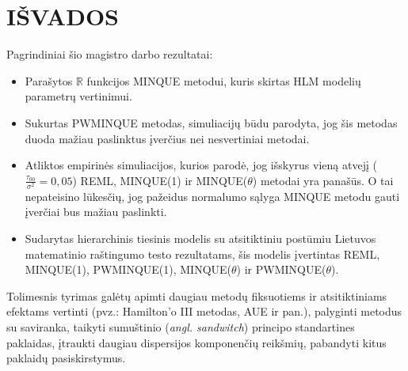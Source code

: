\documentclass[12pt,a4paper]{article}
\newcommand{\R}{{\mathbb R}}
\begin{document}
\newpage
\section{IŠVADOS}
\indent Pagrindiniai šio magistro darbo rezultatai:
\begin{itemize}
\item Parašytos $\R$ funkcijos MINQUE metodui, kuris skirtas HLM modelių parametrų vertinimui.
\item Sukurtas PWMINQUE metodas, simuliacijų būdu parodyta, jog šis metodas duoda mažiau paslinktus įverčius nei nesvertiniai metodai.
\item Atliktos empirinės simuliacijos, kurios parodė, jog išskyrus vieną atvejį ($\frac{\tau_{00}}{\sigma^2}=0,05$) REML, MINQUE(1) ir MINQUE($\theta$) metodai yra panašūs. O tai nepateisino lūkesčių, jog pažeidus normalumo sąlyga MINQUE metodu gauti įverčiai bus mažiau paslinkti.
\item Sudarytas hierarchinis tiesinis modelis su atsitiktiniu postūmiu Lietuvos matematinio raštingumo testo rezultatams, šis modelis įvertintas REML, MINQUE(1), PWMINQUE(1), MINQUE($\theta$) ir PWMINQUE($\theta$).
\end{itemize}

\indent Tolimesnis tyrimas galėtų apimti daugiau metodų fiksuotiems ir atsitiktiniams efektams vertinti (pvz.: Hamilton'o III metodas, AUE ir pan.), palyginti metodus su saviranka, taikyti sumuštinio (\textit{angl. sandwitch}) principo standartines paklaidas, įtraukti daugiau dispersijos komponenčių reikšmių, pabandyti kitus paklaidų pasiskirstymus.
\end{document}
